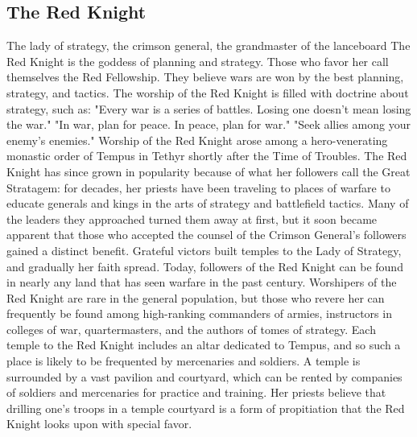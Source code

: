 \documentclass[10pt,a4paper,twoside,twocolumn,openany,bg=print,nodeprecatedcode]{dndbook}
\begin{document}
\subsection{The Red Knight}
The lady of strategy, the crimson general, the grandmaster of the lanceboard
The Red Knight is the goddess of planning and strategy. Those who favor her call themselves the Red Fellowship. They believe wars are won by the best planning, strategy, and tactics. The worship of the Red Knight is filled with doctrine about strategy, such as: "Every war is a series of battles. Losing one doesn't mean losing the war." "In war, plan for peace. In peace, plan for war." "Seek allies among your enemy's enemies."
Worship of the Red Knight arose among a hero-venerating monastic order of Tempus in Tethyr shortly after the Time of Troubles. The Red Knight has since grown in popularity because of what her followers call the Great Stratagem: for decades, her priests have been traveling to places of warfare to educate generals and kings in the arts of strategy and battlefield tactics. Many of the leaders they approached turned them away at first, but it soon became apparent that those who accepted the counsel of the Crimson General's followers gained a distinct benefit. Grateful victors built temples to the Lady of Strategy, and gradually her faith spread.
Today, followers of the Red Knight can be found in nearly any land that has seen warfare in the past century. Worshipers of the Red Knight are rare in the general population, but those who revere her can frequently be found among high-ranking commanders of armies, instructors in colleges of war, quartermasters, and the authors of tomes of strategy. Each temple to the Red Knight includes an altar dedicated to Tempus, and so such a place is likely to be frequented by mercenaries and soldiers. A temple is surrounded by a vast pavilion and courtyard, which can be rented by companies of soldiers and mercenaries for practice and training. Her priests believe that drilling one's troops in a temple courtyard is a form of propitiation that the Red Knight looks upon with special favor.
\end{document}
